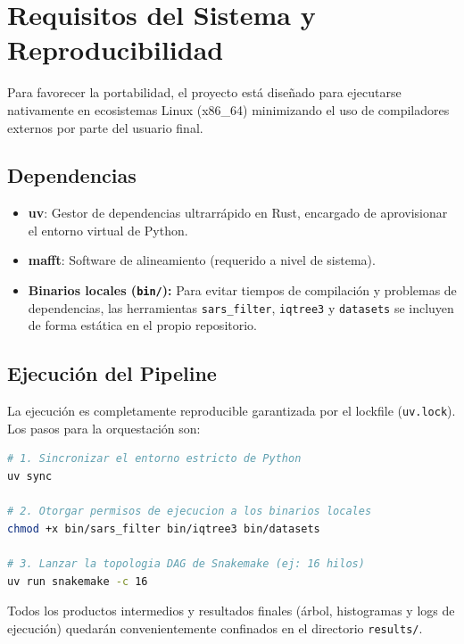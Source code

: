 \documentclass[12pt,a4paper]{article}
\begin{document}
\section{Requisitos del Sistema y Reproducibilidad}

Para favorecer la portabilidad, el proyecto está diseñado para ejecutarse nativamente en ecosistemas Linux (x86\_64) minimizando el uso de compiladores externos por parte del usuario final.

\subsection{Dependencias}
\begin{itemize}
    \item \textbf{uv}: Gestor de dependencias ultrarrápido en Rust, encargado de aprovisionar el entorno virtual de Python.
    \item \textbf{mafft}: Software de alineamiento (requerido a nivel de sistema).
    \item \textbf{Binarios locales (\texttt{bin/}):} Para evitar tiempos de compilación y problemas de dependencias, las herramientas \texttt{sars\_filter}, \texttt{iqtree3} y \texttt{datasets} se incluyen de forma estática en el propio repositorio.
\end{itemize}

\subsection{Ejecución del Pipeline}
La ejecución es completamente reproducible garantizada por el lockfile (\texttt{uv.lock}). Los pasos para la orquestación son:

\begin{lstlisting}[language=bash]
# 1. Sincronizar el entorno estricto de Python
uv sync

# 2. Otorgar permisos de ejecucion a los binarios locales
chmod +x bin/sars_filter bin/iqtree3 bin/datasets

# 3. Lanzar la topologia DAG de Snakemake (ej: 16 hilos)
uv run snakemake -c 16
\end{lstlisting}

Todos los productos intermedios y resultados finales (árbol, histogramas y logs de ejecución) quedarán convenientemente confinados en el directorio \texttt{results/}.
\end{document}
